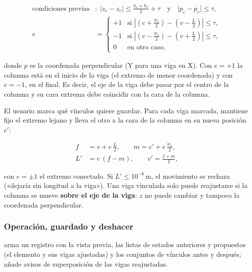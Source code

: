 \begin{align}
	\text{condiciones previas} &: \; \lvert z_c - z_v \rvert \le \tfrac{h_c + h_v}{2} + \tau
	\quad \text{y} \quad \lvert p_c - p_v \rvert \le \tau , \\
	e &=
	\begin{cases}
		+1 & \text{si } \left\lvert \left(c + \tfrac{w_c}{2}\right) - \left(v - \tfrac{L}{2}\right) \right\rvert \le \tau ,\\[2pt]
		-1 & \text{si } \left\lvert \left(c - \tfrac{w_c}{2}\right) - \left(v + \tfrac{L}{2}\right) \right\rvert \le \tau ,\\[2pt]
		0 & \text{en otro caso,}
	\end{cases}
\end{align}

\noindent donde $p$ es la coordenada perpendicular (Y para una viga en X). Con $e = +1$ la columna está en el inicio de
la viga (el extremo de menor coordenada) y con $e = -1$, en el final. Es decir, el eje de la viga debe pasar por el
centro de la columna y su cara extrema debe coincidir con la cara de la columna.

El usuario marca qué vínculos quiere guardar. Para cada viga marcada,  mantiene fijo
el extremo lejano y lleva el otro a la cara de la columna en su nueva posición $c'$:

\begin{align}
	f &= v + e \, \tfrac{L}{2}, \qquad m = c' + e \, \tfrac{w_c}{2}, \\
	L' &= e \, (f - m), \qquad v' = \tfrac{f + m}{2},
\end{align}

\noindent con $e = \pm 1$ el extremo conectado. Si $L' \le 10^{-6}$\,m, el movimiento se rechaza («dejaría sin
longitud a la viga»). Una viga vinculada solo puede reajustarse si la columna se mueve \textbf{sobre el eje de la
viga}: $z$ no puede cambiar y tampoco la coordenada perpendicular.

\subsubsection{Operación, guardado y deshacer}

 arma un registro  con la vista previa, las listas de estados
anteriores y propuestos (el elemento y sus vigas ajustadas) y los conjuntos de vínculos antes y después; añade avisos
de superposición de las vigas reajustadas.


